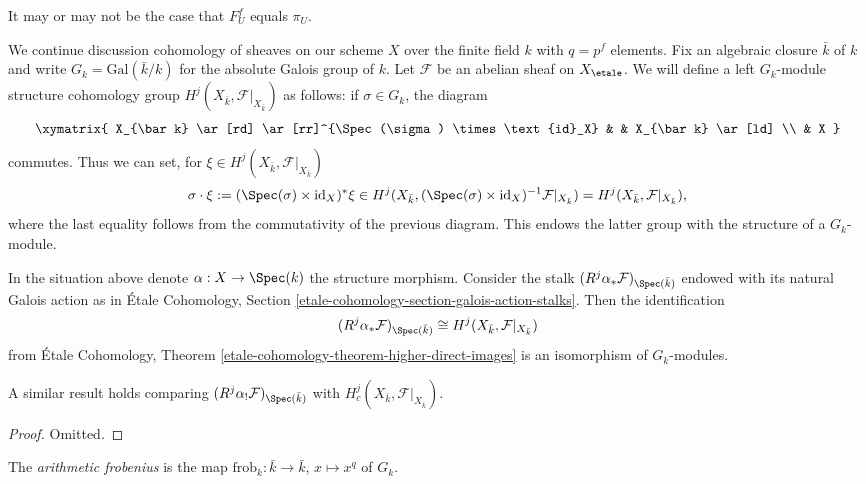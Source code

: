 \begin{remark}
\label{remark-may-be-confusing}
It may or may not be the case that $F^f_U$ equals $\pi_U$.
\end{remark}

\noindent
We continue discussion cohomology of sheaves on our scheme $X$ over
the finite field $k$ with $q = p^f$ elements.
Fix an algebraic closure $\bar k$ of $k$ and write $G_k =
\text{Gal}(\bar k/k)$ for the absolute Galois group of $k$.
Let $\mathcal{F}$ be an abelian sheaf on $X_\etale$.
We will define a left $G_k$-module structure
cohomology group $H^j (X_{\bar k}, \mathcal{F}|_{X_{\bar k}})$
as follows: if $\sigma \in G_k$, the diagram
$$
\xymatrix{
X_{\bar k} \ar[rd] \ar[rr]^{\Spec(\sigma) \times \text{id}_X} & &
X_{\bar k} \ar[ld] \\
& X
}
$$
commutes. Thus we can set, for $\xi \in H^j (X_{\bar k}, \mathcal{F}|_{X_{\bar
k}})$
$$
\sigma \cdot \xi := (\Spec(\sigma) \times \text{id}_X)^*\xi \in
H^j(X_{\bar k}, (\Spec(\sigma) \times \text{id}_X)^{-1}
\mathcal{F}|_{X_{\bar k}})
= H^j (X_{\bar k}, \mathcal{F}|_{X_{\bar k}}),
$$
where the last equality follows from the commutativity of the previous diagram.
This endows the latter group with the structure of a $G_k$-module.

\begin{lemma}
\label{lemma-two-actions-agree}
In the situation above denote $\alpha : X \to \Spec(k)$ the structure morphism.
Consider the stalk $(R^j\alpha_*\mathcal{F})_{\Spec(\bar k)}$ endowed with its
natural Galois action as in
\'Etale Cohomology, Section \ref{etale-cohomology-section-galois-action-stalks}.
Then the identification
$$
(R^j\alpha_*\mathcal{F})_{\Spec(\bar k)} \cong H^j (X_{\bar k},
\mathcal{F}|_{X_{\bar k}})
$$
from
\'Etale Cohomology, Theorem \ref{etale-cohomology-theorem-higher-direct-images}
is an isomorphism of $G_k$-modules.
\end{lemma}

\noindent
A similar result holds comparing
$(R^j\alpha_!\mathcal{F})_{\Spec(\bar k)}$ with
$H^j_c (X_{\bar k}, \mathcal{F}|_{X_{\bar k}})$.

\begin{proof}
Omitted.
\end{proof}

\begin{definition}
\label{definition-arithmetic-frobenius}
The {\it arithmetic frobenius} is the map
$\text{frob}_k : \bar k \to \bar k$, $x \mapsto x^q$ of $G_k$.
\end{definition}

